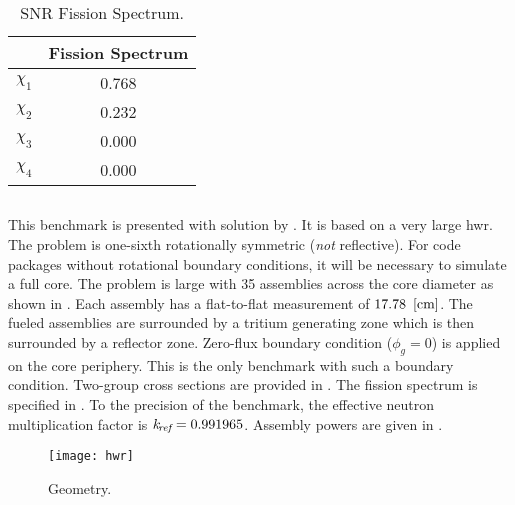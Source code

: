     \restoregeometry
    \pagestyle{plain}
    \thispagestyle{plain}

    \begin{table}
      \caption{SNR Fission Spectrum.}
      \label{tab:snrchi}
      \begin{center}
        \begin{tabular}{cc}
          \toprule
          &Fission Spectrum \\
          \midrule
          $\chi_1$ &0.768 \\
          $\chi_2$ &0.232 \\
          $\chi_3$ &0.000 \\
          $\chi_4$ &0.000 \\
          \bottomrule
        \end{tabular}
      \end{center}
    \end{table}

  \subsection{\texorpdfstring{}{HWR}}
    \label{sec:hwr}
    This benchmark is presented with solution by \textcite{chao}.
    It is based on a very large \gls{hwr}. The problem is one-sixth rotationally
    symmetric (\textit{not} reflective). For code packages without rotational
    boundary conditions, it will be necessary to simulate a full core. The
    problem is large with 35 assemblies across the core diameter as shown in
    . Each assembly has a flat-to-flat measurement of 
    ${17.78~\left[\text{{cm}}\right]}$. The fueled assemblies are surrounded by a tritium
    generating zone which is then surrounded by a reflector zone. Zero-flux
    boundary condition ($\phi_g = 0$) is applied on the core periphery. This is
    the only benchmark with such a boundary condition. Two-group cross sections
    are provided in . The fission spectrum is specified in
    . To the precision of the benchmark, the effective neutron
    multiplication factor is $k_{\!\mbox{\scriptsize \em ref}} = 0.991965$. Assembly powers are given in
    .

    \begin{figure}
      \centering
      \texttt{[image: hwr]}
      \caption{ Geometry.}
      \label{fig:hwr_geom}
    \end{figure}

